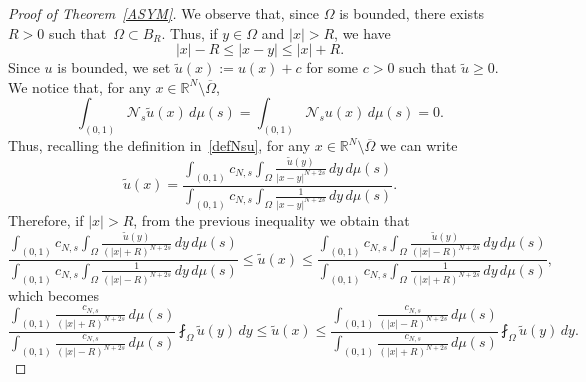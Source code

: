 \documentclass[12pt,a4paper,intlimits,sumlimits]{amsart}
\def \R {\mathbb{R}}
\def \Ns {\mathscr{N}_{s}}
\theoremstyle{definition}
\theoremstyle{plain}
\numberwithin{equation}{section}
\renewcommand{\leq}{\leqslant}
\renewcommand{\geq}{\geqslant}
\begin{document}
\begin{proof}[Proof of Theorem~\ref{ASYM}]
We observe that, since $\Omega$ is bounded, there exists~$R>0$
such that~$\Omega \subset B_R$.
Thus, if $y\in \Omega$ and $|x|>R$, we have
\[
|x|-R\leq |x-y|\leq |x|+R.
\]
Since $u$ is bounded, we set $\tilde{u}(x):=u(x)+c$ for some
$c>0$ such that $\tilde{u}\geq 0$. We notice that, for any
$x\in \R^N \setminus \overline{\Omega}$,
\[
\int_{(0,1)} \Ns \tilde{u}(x)\,d\mu(s)
=\int_{(0,1)} \Ns u(x)\,d\mu(s)=0.
\]
Thus, recalling the definition in~\eqref{defNsu}, for any 
$x\in \R^N\setminus \overline{\Omega}$ we can write 
\[
\tilde{u}(x)=\dfrac{\displaystyle\int_{(0,1)}c_{N,s}\int_\Omega \frac{\tilde{u}(y)}{|x-y|^{N+2s}}\,dy\,d\mu(s)}{\displaystyle\int_{(0,1)}c_{N,s}\int_\Omega \frac{1}{|x-y|^{N+2s}}\,dy\,d\mu(s)}.
\]
Therefore, if $|x|>R$, from the previous inequality we obtain that
\[
\dfrac{\displaystyle\int_{(0,1)}c_{N,s}\int_\Omega \frac{\tilde{u}(y)}{(|x|+R)^{N+2s}}\,dy\,d\mu(s)}{\displaystyle\int_{(0,1)}c_{N,s}\int_\Omega \frac{1}{(|x|-R)^{N+2s}}\,dy\,d\mu(s)}
\leq \tilde{u}(x) \leq
\dfrac{\displaystyle\int_{(0,1)}c_{N,s}\int_\Omega \frac{\tilde{u}(y)}{(|x|-R)^{N+2s}}\,dy\,d\mu(s)}{\displaystyle\int_{(0,1)}c_{N,s}\int_\Omega \frac{1}{(|x|+R)^{N+2s}}\,dy\,d\mu(s)},
\]
which becomes
\begin{equation}\label{troppipiani}
\dfrac{\displaystyle\int_{(0,1)} \frac{c_{N,s}}{(|x|+R)^{N+2s}}\,d\mu(s)}{\displaystyle\int_{(0,1)} \frac{c_{N,s}}{(|x|-R)^{N+2s}}\,d\mu(s)} \fint_{\Omega}\tilde{u}(y)\,dy
\leq \tilde{u}(x) \leq
\dfrac{\displaystyle\int_{(0,1)} \frac{c_{N,s}}{(|x|-R)^{N+2s}}\,d\mu(s)}{\displaystyle\int_{(0,1)} \frac{c_{N,s}}{(|x|+R)^{N+2s}}\,d\mu(s)} \fint_{\Omega}\tilde{u}(y)\,dy.
\end{equation}


\end{proof}
\end{document}
